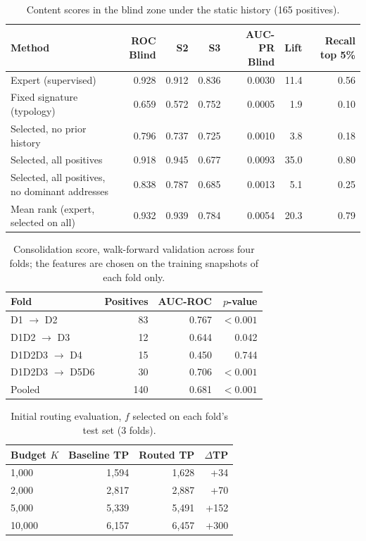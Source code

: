 \begin{table}[t]
\centering
\caption{Content scores in the blind zone under the static history (165 positives).}
\label{tab:scores}
\begin{tabular}{lrrrrrr}
\toprule
Method & ROC Blind & S2 & S3 & AUC-PR Blind & Lift & Recall top 5\% \\
\midrule
Expert (supervised) & 0.928 & 0.912 & 0.836 & 0.0030 & 11.4 & 0.56 \\
Fixed signature (typology) & 0.659 & 0.572 & 0.752 & 0.0005 & 1.9 & 0.10 \\
Selected, no prior history & 0.796 & 0.737 & 0.725 & 0.0010 & 3.8 & 0.18 \\
Selected, all positives & 0.918 & 0.945 & 0.677 & 0.0093 & 35.0 & 0.80 \\
Selected, all positives, no dominant addresses & 0.838 & 0.787 & 0.685 & 0.0013 & 5.1 & 0.25 \\
Mean rank (expert, selected on all) & 0.932 & 0.939 & 0.784 & 0.0054 & 20.3 & 0.79 \\
\bottomrule
\end{tabular}
\end{table}

\begin{table}[t]
\centering
\caption{Consolidation score, walk-forward validation across four folds; the features are chosen on the training snapshots of each fold only.}
\label{tab:walkforward}
\begin{tabular}{lrrr}
\toprule
Fold & Positives & AUC-ROC & $p$-value \\
\midrule
D1 $\to$ D2 & 83 & 0.767 & $<0.001$ \\
D1D2 $\to$ D3 & 12 & 0.644 & 0.042 \\
D1D2D3 $\to$ D4 & 15 & 0.450 & 0.744 \\
D1D2D3 $\to$ D5D6 & 30 & 0.706 & $<0.001$ \\
Pooled & 140 & 0.681 & $<0.001$ \\
\bottomrule
\end{tabular}
\end{table}

\begin{table}[t]
\centering
\caption{Initial routing evaluation, $f$ selected on each fold's test set (3 folds).}
\label{tab:route_leak}
\begin{tabular}{lrrr}
\toprule
Budget $K$ & Baseline TP & Routed TP & $\Delta$TP \\
\midrule
1,000 & 1,594 & 1,628 & +34 \\
2,000 & 2,817 & 2,887 & +70 \\
5,000 & 5,339 & 5,491 & +152 \\
10,000 & 6,157 & 6,457 & +300 \\
\bottomrule
\end{tabular}
\end{table}

